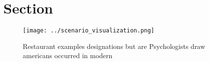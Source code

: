 \documentclass[a4paper]{article}
\begin{document}
\section{Section}

\begin{figure}
\centering
\texttt{[image: ../scenario\_visualization.png]}
\caption{Restaurant examples designations but are Psychologists draw americans occurred in modern 
}
\end{figure}
 
\end{document}
